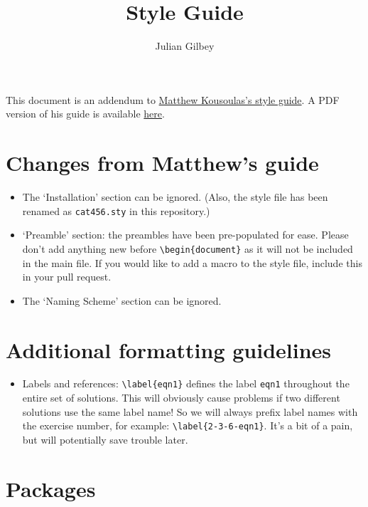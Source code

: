 \documentclass{article}
\title{Style Guide}
\author{Julian Gilbey}
\begin{document}
\maketitle

This document is an addendum to
\href{https://github.com/madkous/math490/blob/master/style-guide/style-guide.tex}{Matthew
  Kousoulas's style guide}.  A PDF version of his guide is available
\href{https://github.com/juliangilbey/math490/blob/minor-latex-fixes/style-guide/style-guide.pdf}{here}.

\section*{Changes from Matthew's guide}

\begin{itemize}
\item The `Installation' section can be ignored.  (Also, the style
  file has been renamed as \verb+cat456.sty+ in this repository.)
\item `Preamble' section: the preambles have been pre-populated for
  ease.  Please don't add anything new before \verb+\begin{document}+
  as it will not be included in the main file.  If you would like to
  add a macro to the style file, include this in your pull request.
\item The `Naming Scheme' section can be ignored.
\end{itemize}

\section*{Additional formatting guidelines}

\begin{itemize}
\item Labels and references: \verb+\label{eqn1}+ defines the label
  \verb+eqn1+ throughout the entire set of solutions.  This will
  obviously cause problems if two different solutions use the same
  label name!  So we will always prefix label names with the exercise
  number, for example: \verb+\label{2-3-6-eqn1}+.  It's a bit of a
  pain, but will potentially save trouble later.
\end{itemize}

\section*{Packages}
\end{document}
